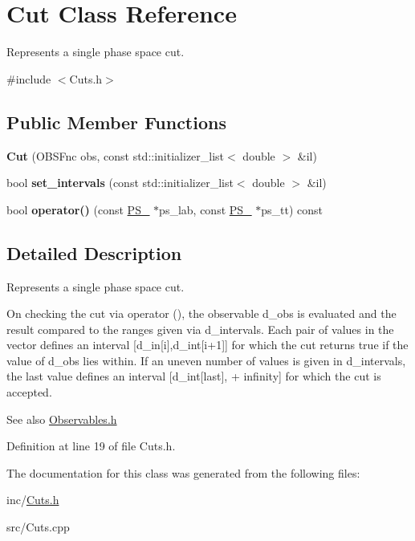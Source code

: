\hypertarget{classCut}{}\section{Cut Class Reference}
\label{classCut}


Represents a single phase space cut.  




{\ttfamily \#include $<$Cuts.\+h$>$}

\subsection*{Public Member Functions}
\begin{DoxyCompactItemize}
\item 
\hypertarget{classCut_a924d05b3428cdd5fec4445ca759c7867}{}{\bfseries Cut} (O\+B\+S\+Fnc obs, const std\+::initializer\+\_\+list$<$ double $>$ \&il)\label{classCut_a924d05b3428cdd5fec4445ca759c7867}

\item 
\hypertarget{classCut_a00f83bc280780fd2922a6a93e6932740}{}bool {\bfseries set\+\_\+intervals} (const std\+::initializer\+\_\+list$<$ double $>$ \&il)\label{classCut_a00f83bc280780fd2922a6a93e6932740}

\item 
\hypertarget{classCut_ab98923dda43d561e4645ce4fac915f59}{}bool {\bfseries operator()} (const \hyperlink{classPS__2}{P\+S\+\_} $\ast$ps\+\_\+lab, const \hyperlink{classPS__2}{P\+S\+\_} $\ast$ps\+\_\+tt) const \label{classCut_ab98923dda43d561e4645ce4fac915f59}

\end{DoxyCompactItemize}


\subsection{Detailed Description}
Represents a single phase space cut. 

On checking the cut via operator \textquotesingle{}()\textquotesingle{}, the observable \textquotesingle{}d\+\_\+obs\textquotesingle{} is evaluated and the result compared to the ranges given via \textquotesingle{}d\+\_\+intervals\textquotesingle{}. Each pair of values in the vector defines an interval \mbox{[}d\+\_\+in\mbox{[}i\mbox{]},d\+\_\+int\mbox{[}i+1\mbox{]}\mbox{]} for which the cut returns true if the value of \textquotesingle{}d\+\_\+obs\textquotesingle{} lies within. If an uneven number of values is given in \textquotesingle{}d\+\_\+intervals\textquotesingle{}, the last value defines an interval \mbox{[}d\+\_\+int\mbox{[}last\mbox{]}, + infinity\mbox{]} for which the cut is accepted. \begin{DoxySeeAlso}{See also}
\hyperlink{Observables_8h}{Observables.\+h} 
\end{DoxySeeAlso}


Definition at line 19 of file Cuts.\+h.



The documentation for this class was generated from the following files\+:\begin{DoxyCompactItemize}
\item 
inc/\hyperlink{Cuts_8h}{Cuts.\+h}\item 
src/Cuts.\+cpp\end{DoxyCompactItemize}
